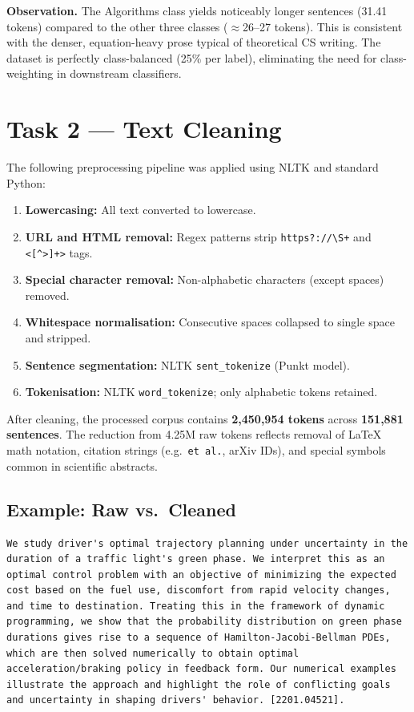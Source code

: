\documentclass[10pt,a4paper]{article}
\begin{document}
\textbf{Observation.} The Algorithms class yields noticeably longer sentences (31.41 tokens) compared to the other three classes ($\approx$26--27 tokens). This is consistent with the denser, equation-heavy prose typical of theoretical CS writing. The dataset is perfectly class-balanced (25\% per label), eliminating the need for class-weighting in downstream classifiers.

\section{Task 2 --- Text Cleaning}

The following preprocessing pipeline was applied using NLTK and standard Python:

\begin{enumerate}[leftmargin=*]
    \item \textbf{Lowercasing:} All text converted to lowercase.
    \item \textbf{URL and HTML removal:} Regex patterns strip \verb|https?://\S+| and \verb|<[^>]+>| tags.
    \item \textbf{Special character removal:} Non-alphabetic characters (except spaces) removed.
    \item \textbf{Whitespace normalisation:} Consecutive spaces collapsed to single space and stripped.
    \item \textbf{Sentence segmentation:} NLTK \texttt{sent\_tokenize} (Punkt model).
    \item \textbf{Tokenisation:} NLTK \texttt{word\_tokenize}; only alphabetic tokens retained.
\end{enumerate}

After cleaning, the processed corpus contains \textbf{2{,}450{,}954 tokens} across \textbf{151{,}881 sentences}. The reduction from 4.25M raw tokens reflects removal of LaTeX math notation, citation strings (e.g.\ \texttt{et al.}, arXiv IDs), and special symbols common in scientific abstracts.

\subsection*{Example: Raw vs.\ Cleaned}

\begin{lstlisting}[language={}, caption={Raw abstract excerpt (Algorithms class).}]
We study driver's optimal trajectory planning under uncertainty in the duration of a traffic light's green phase. We interpret this as an optimal control problem with an objective of minimizing the expected cost based on the fuel use, discomfort from rapid velocity changes, and time to destination. Treating this in the framework of dynamic programming, we show that the probability distribution on green phase durations gives rise to a sequence of Hamilton-Jacobi-Bellman PDEs, which are then solved numerically to obtain optimal acceleration/braking policy in feedback form. Our numerical examples illustrate the approach and highlight the role of conflicting goals and uncertainty in shaping drivers' behavior. [2201.04521].
\end{lstlisting}
\end{document}
